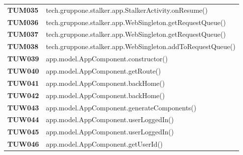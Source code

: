 \documentclass[../../piano-di-qualifica.tex]{subfiles}
\begin{document}
\begin{longtable}[H]{>{\centering\bfseries}m{3cm} >{}m{13cm}}
  TUM035             & tech.gruppone.stalker.app.StalkerActivity.onResume\@()                                                  \\

  TUM036             & tech.gruppone.stalker.app.WebSingleton.getRequestQueue\@()                                              \\

  TUM037             & tech.gruppone.stalker.app.WebSingleton.getRequestQueue\@()                                              \\

  TUM038             & tech.gruppone.stalker.app.WebSingleton.addToRequestQueue\@()                                            \\





  TUW039             & app.model.AppComponent.constructor\@()                                                                  \\

  TUW040             & app.model.AppComponent.getRoute\@()                                                                     \\

  TUW041             & app.model.AppComponent.backHome\@()                                                                     \\

  TUW042             & app.model.AppComponent.backHome\@()                                                                     \\

  TUW043             & app.model.AppComponent.generateComponents\@()                                                           \\

  TUW044             & app.model.AppComponent.userLoggedIn\@()                                                                 \\

  TUW045             & app.model.AppComponent.userLoggedIn\@()                                                                 \\

  TUW046             & app.model.AppComponent.getUserId\@()                                                                    \\


\end{longtable}
\end{document}
